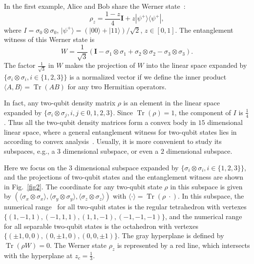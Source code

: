 \documentclass[twocolumn,pra,showpacs,superscriptaddress]{revtex4-1}
\DeclareMathOperator{\Tr}{Tr}
\begin{document}
In the first example, Alice and Bob share the Werner state~\cite{wer}:
\begin{equation}
\label{werner}
  \rho_z = \frac{1-z}{4} \textbf{I} + z|\psi^+\rangle\langle\psi^+|,
\end{equation}
where $I=\sigma_{0}\otimes\sigma_{0}$,
$|\psi^+\rangle=(|00\rangle+|11\rangle)/\sqrt{2}$, $z\in[0,1]$. The
entanglement witness of this Werner state is\cite{hyl}
\begin{equation}
\label{werner-witness}
W =\frac{1}{\sqrt{3}} (\textbf{I} -
  \sigma_1\otimes\sigma_1 + \sigma_2\otimes\sigma_2 -
  \sigma_3\otimes\sigma_3).
\end{equation}
The factor $\frac{1}{ \sqrt{3}}$ in $W$ makes the projection of $W$
into the linear space expanded by
$\{\sigma_{i}\otimes\sigma_{i}, i\in\{1,2,3\}\}$ is a normalized
vector if we define the inner product $\langle A,B \rangle=\Tr(AB)$
for any two Hermitian operators.

In fact, any two-qubit density matrix $\rho$ is an element in the
linear space expanded by
$\{\sigma_{i}\otimes\sigma_{j}, i,j\in{0,1,2,3}\}$. Since
$\Tr(\rho)=1$, the component of $I$ is $\frac{1}{4}$. Thus all the
two-qubit density matrices form a convex body in $15$ dimensional
linear space, where a general entanglement witness for two-qubit
states lies in according to convex analysis~\cite{rock}. Usually, it
is more convenient to study its subspaces, e.g., a $3$ dimensional
subspace, or even a $2$ dimensional subspace.

Here we focus on the $3$ dimensional subspace expanded by
$\{\sigma_{i}\otimes\sigma_{i}, i\in\{1,2,3\}\}$, and the projections
of two-qubit states and the entanglement witness are shown in
Fig.~\ref{fig2}. The coordinate for any two-qubit state $\rho$ in this
subspace is given by
$(\langle \sigma_{x} \otimes \sigma_{x} \rangle, \langle \sigma_{y}
\otimes \sigma_{y} \rangle, \langle \sigma_{z} \otimes \sigma_{z}
\rangle )$ with $\langle \cdot \rangle = \Tr(\rho\; \cdot)$. In this subspace,
the numerical range~\cite{chen2016} for all two-qubit states is the
regular tetrahedron with vertexes
$\{(1,-1,1),(-1,1,1),(1,1,-1),(-1,-1,-1)\}$, and the numerical range
for all separable two-qubit states is the octahedron with vertexes
$\{(\pm 1,0,0),(0, \pm 1, 0), (0,0,\pm 1)\}$. The gray hyperplane is
defined by $\Tr(\rho W)=0$. The Werner state $\rho_{z}$ is
represented by a red line, which intersects with the hyperplane at
$z_{c}=\frac{1}{3}$.
\end{document}
